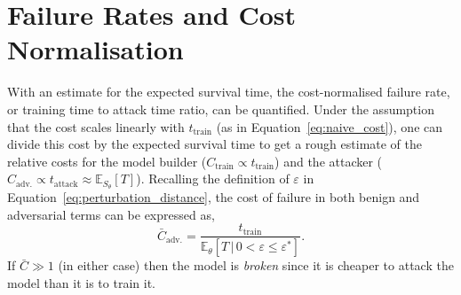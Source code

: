 


\section{Failure Rates and Cost Normalisation}
\label{cost_normalization}

With an estimate for the expected survival time, the cost-normalised failure rate, or training time to attack time ratio, can be quantified. Under the assumption that the cost scales linearly with $t_{\mathrm{train}}$ (as in Equation~\ref{eq:naive_cost}), one can divide this cost by the expected survival time to get a rough estimate of the relative costs for the model builder ($C_{\mathrm{train}} \propto t_{\mathrm{train}}$) and the attacker ($C_{\mathrm{adv.}} \propto t_{\mathrm{attack}} \approx \mathbb{E}_{S_\theta}[T]$). Recalling the definition of $\varepsilon$ in Equation~\ref{eq:perturbation_distance}, the cost of failure in both benign and adversarial terms can be expressed as,
\begin{equation}
	\bar{C}_{\mathrm{adv.}}=\frac{t_{\mathrm{train}}}{\mathbb{E}_{\theta}[T \,|\, 0 < \varepsilon \leq \varepsilon^*]}.
	\label{eq:cost}
\end{equation}
If $\bar{C} \gg 1$ (in either case) then the model is \textit{broken} since it is cheaper to attack the model than it is to train it. 


